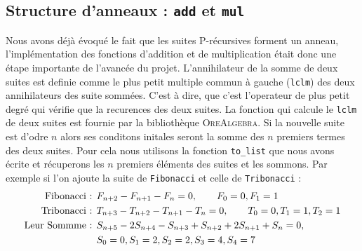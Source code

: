 \documentclass[12pt]{article}
\newlength{\charwidth}
\newcommand{\uline}{\underline{\hspace{2\charwidth}}}
\begin{document}
    \subsection{Structure d'anneaux : \texttt{\uline add\uline } et \texttt{\uline mul\uline}}
        \label{sec:ring}
        Nous avons déjà évoqué le fait que les suites P-récursives forment un anneau,
        l'implémentation des fonctions d'addition et de multiplication était donc une étape
        importante de l'avancée du projet.
        L'annihilateur de la somme de deux suites est definie comme le plus petit 
        multiple commun à gauche (\texttt{lclm}) des deux annihilateurs des suite sommées.
        C'est à dire, que c'est l'operateur de plus petit degré qui vérifie que la recurences des 
        deux suites.
        La fonction qui calcule le \texttt{lclm} de deux suites est fournie par la bibliothèque
        \textsc{OreAlgebra}. 
        Si la nouvelle suite est d'odre $n$ alors ses conditons initales seront la somme des 
        $n$ premiers termes des deux suites. Pour cela nous utilisons la fonction \texttt{to\_list}
        que nous avons écrite
        et récuperons les $n$ premiers éléments des suites et les sommons.
        Par exemple si l'on ajoute la suite de \texttt{Fibonacci} et celle de \texttt{Tribonacci} :
        \begin{align*}
            \textnormal{Fibonacci : } &F_{n+2} - F_{n+1} - F_n = 0,\qquad F_0=0, F_1=1\\
            \textnormal{Tribonacci : } &T_{n+3} - T_{n+2} - T_{n+1} - T_n = 0,\qquad T_0 = 0, T_1 = 1, T_2 = 1\\
            \textnormal{Leur Sommme : } &S_{n+5} - 2S_{n+4} - S_{n+3} + S_{n+2} + 2S_{n+1} + S_n = 0,\\
            &S_0 = 0, S_1 = 2, S_2 = 2, S_3 = 4, S_4 = 7
        \end{align*} 
        
\end{document}

